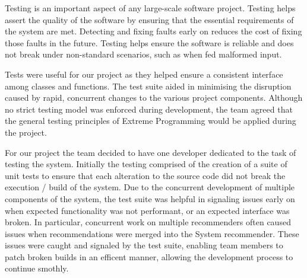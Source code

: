 \documentclass{l3proj}
\begin{document}
Testing is an important aspect of any large-scale software project.
Testing helps assert the quality of the software by ensuring that the essential requirements of the system are met.
Detecting and fixing faults early on reduces the cost of fixing those faults in the future.
Testing helps ensure the software is reliable and does not break under non-standard scenarios, such as when fed malformed input.

Tests were useful for our project as they helped ensure a consistent interface among classes and functions. The test suite aided in minimising the disruption caused by rapid, concurrent changes to the various project components.
Although no strict testing model was enforced during development, the team agreed that the general testing principles of Extreme Programming would be applied during the project.

For our project the team decided to have one developer dedicated to the task of testing the system. %
Initially the testing comprised of the creation of a suite of unit tests to ensure that each alteration to the source code did not break the execution / build of the system.
Due to the concurrent development of multiple components of the system, the test suite was helpful in signaling issues early on when expected functionality was not performant, or an expected interface was broken. In particular, concurrent work on multiple recommenders often caused issues when recommendations were merged into the System recommender. These issues were caught and signaled by the test suite, enabling team members to patch broken builds in an efficent manner, allowing the development process to continue smothly.
\end{document}
